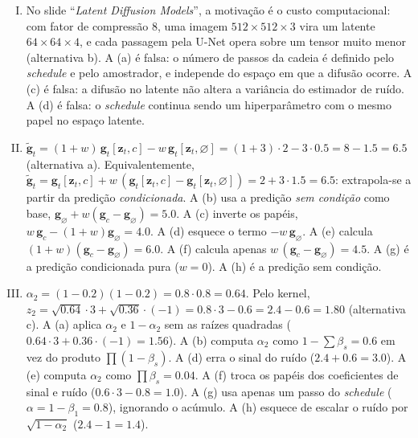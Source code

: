 \documentclass{dlproblemset}
\begin{document}
\begin{enumerate}[I)]
    \item No slide ``\textit{Latent Diffusion Models}'', a motivação é o custo computacional: com fator de compressão $8$, uma imagem $512\times 512\times 3$ vira um latente $64\times 64\times 4$, e cada passagem pela U-Net opera sobre um tensor muito menor (alternativa b). A (a) é falsa: o número de passos da cadeia é definido pelo \textit{schedule} e pelo amostrador, e independe do espaço em que a difusão ocorre. A (c) é falsa: a difusão no latente não altera a variância do estimador de ruído. A (d) é falsa: o \textit{schedule} continua sendo um hiperparâmetro com o mesmo papel no espaço latente.
    \item $\tilde{\mathbf{g}}_t = (1 + w)\,\mathbf{g}_t[\mathbf{z}_t, c] - w\,\mathbf{g}_t[\mathbf{z}_t, \varnothing] = (1+3)\cdot 2 - 3\cdot 0.5 = 8 - 1.5 = 6.5$ (alternativa a). Equivalentemente, $\tilde{\mathbf{g}}_t = \mathbf{g}_t[\mathbf{z}_t,c] + w\,(\mathbf{g}_t[\mathbf{z}_t,c] - \mathbf{g}_t[\mathbf{z}_t,\varnothing]) = 2 + 3\cdot 1.5 = 6.5$: extrapola-se a partir da predição \emph{condicionada}. A (b) usa a predição \emph{sem condição} como base, $\mathbf{g}_\varnothing + w(\mathbf{g}_c - \mathbf{g}_\varnothing) = 5.0$. A (c) inverte os papéis, $w\,\mathbf{g}_c - (1+w)\mathbf{g}_\varnothing = 4.0$. A (d) esquece o termo $-w\,\mathbf{g}_\varnothing$. A (e) calcula $(1+w)(\mathbf{g}_c - \mathbf{g}_\varnothing) = 6.0$. A (f) calcula apenas $w\,(\mathbf{g}_c - \mathbf{g}_\varnothing) = 4.5$. A (g) é a predição condicionada pura ($w = 0$). A (h) é a predição sem condição.
    \item $\alpha_2 = (1 - 0.2)(1 - 0.2) = 0.8 \cdot 0.8 = 0.64$. Pelo kernel, $z_2 = \sqrt{0.64}\cdot 3 + \sqrt{0.36}\cdot(-1) = 0.8 \cdot 3 - 0.6 = 2.4 - 0.6 = 1.80$ (alternativa c). A (a) aplica $\alpha_2$ e $1-\alpha_2$ sem as raízes quadradas ($0.64\cdot 3 + 0.36\cdot(-1) = 1.56$). A (b) computa $\alpha_2$ como $1 - \sum\beta_s = 0.6$ em vez do produto $\prod(1-\beta_s)$. A (d) erra o sinal do ruído ($2.4 + 0.6 = 3.0$). A (e) computa $\alpha_2$ como $\prod \beta_s = 0.04$. A (f) troca os papéis dos coeficientes de sinal e ruído ($0.6\cdot 3 - 0.8 = 1.0$). A (g) usa apenas um passo do \textit{schedule} ($\alpha = 1 - \beta_1 = 0.8$), ignorando o acúmulo. A (h) esquece de escalar o ruído por $\sqrt{1-\alpha_2}$ ($2.4 - 1 = 1.4$).

\end{enumerate}
\end{document}
